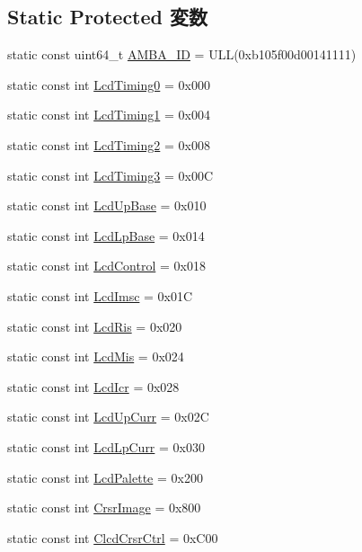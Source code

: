 \subsection*{Static Protected 変数}
\begin{DoxyCompactItemize}
\item 
static const uint64\_\-t \hyperlink{classPl111_ae438dff5177bb7a98567cd94061edab4}{AMBA\_\-ID} = ULL(0xb105f00d00141111)
\item 
static const int \hyperlink{classPl111_a3527733d2eb0cefb4a83143afa924755}{LcdTiming0} = 0x000
\item 
static const int \hyperlink{classPl111_a310527f5b0ebff18e9d61839aaca448e}{LcdTiming1} = 0x004
\item 
static const int \hyperlink{classPl111_afddc0e26839afc83296ce772f7de493c}{LcdTiming2} = 0x008
\item 
static const int \hyperlink{classPl111_ae9ebad3cdc05f8b4bd6d58f25671d432}{LcdTiming3} = 0x00C
\item 
static const int \hyperlink{classPl111_a385caff7c0262117f8d7241a57b892a5}{LcdUpBase} = 0x010
\item 
static const int \hyperlink{classPl111_a8a50fbb9fcfc98bc0fe7809262eacf55}{LcdLpBase} = 0x014
\item 
static const int \hyperlink{classPl111_a4d50818fad414b34e919b78bd7ee0394}{LcdControl} = 0x018
\item 
static const int \hyperlink{classPl111_a044c182c88148d01bd70c98cce04ddd5}{LcdImsc} = 0x01C
\item 
static const int \hyperlink{classPl111_a7f3aa652b9a702247d99dee87aee4786}{LcdRis} = 0x020
\item 
static const int \hyperlink{classPl111_a50dec57b9ad8f6a398dcc5929a9648f8}{LcdMis} = 0x024
\item 
static const int \hyperlink{classPl111_a19569f83ff4896d1f17dddaadb91e2d7}{LcdIcr} = 0x028
\item 
static const int \hyperlink{classPl111_a6116890c11c92aed71a18947756a3423}{LcdUpCurr} = 0x02C
\item 
static const int \hyperlink{classPl111_a13e6a3547fe4af8f82d6d4142da64f1d}{LcdLpCurr} = 0x030
\item 
static const int \hyperlink{classPl111_a097bcd7c2d25dfaeccce1e343cb58495}{LcdPalette} = 0x200
\item 
static const int \hyperlink{classPl111_afdfe18094877bc4a8436b4f34ed515f4}{CrsrImage} = 0x800
\item 
static const int \hyperlink{classPl111_a026d609da822510f1c3fcc469ed4ba44}{ClcdCrsrCtrl} = 0xC00

\end{DoxyCompactItemize}
